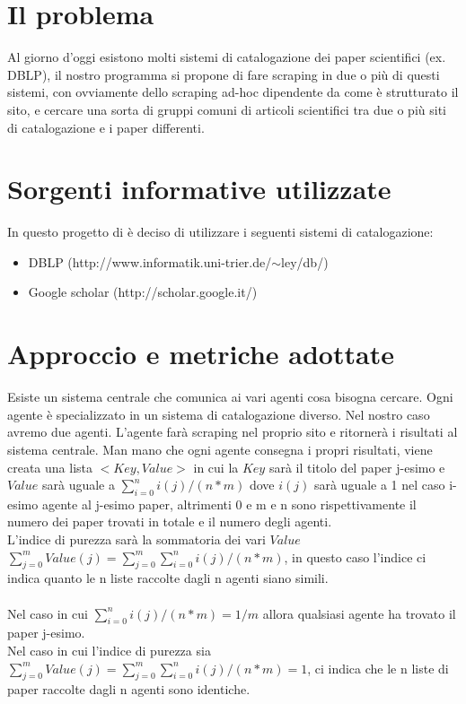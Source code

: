 \documentclass[12pt]{article}
\begin{document}
\maketitle

\section{Il problema}
Al giorno d'oggi esistono molti sistemi di catalogazione dei paper scientifici (ex. DBLP), il nostro programma si propone di fare scraping in due o pi\`u di questi sistemi, con ovviamente dello scraping ad-hoc dipendente da come \`e strutturato il sito, e cercare una sorta di gruppi comuni di articoli scientifici tra due o pi\`u siti di catalogazione e i paper differenti.

\section{Sorgenti informative utilizzate}
In questo progetto di \`e deciso di utilizzare i seguenti sistemi di catalogazione:
\begin{itemize}
\item DBLP (http://www.informatik.uni-trier.de/$\sim$ley/db/)
\item Google scholar (http://scholar.google.it/)
\end{itemize}

\section{Approccio e metriche adottate}
Esiste un sistema centrale che comunica ai vari agenti cosa bisogna cercare. Ogni agente \`e specializzato in un sistema di catalogazione diverso. Nel nostro caso avremo due agenti. L'agente far\`a scraping nel proprio sito e ritorner\`a i risultati al sistema centrale. Man mano che ogni agente consegna i propri risultati, viene creata una lista $<Key, Value>$ in cui la $Key$ sar\`a il titolo del paper j-esimo e $Value$ sar\`a uguale a $\displaystyle\sum\limits_{i=0}^n i(j)/(n*m)$ dove $i(j)$ sar\`a uguale a 1 nel caso i-esimo agente al j-esimo paper, altrimenti 0 e m e n sono rispettivamente il numero dei paper trovati in totale e il numero degli agenti.\\
L'indice di purezza sar\`a la sommatoria dei vari $Value$ $\displaystyle\sum\limits_{j=0}^m Value(j) = \displaystyle\sum\limits_{j=0}^m \displaystyle\sum\limits_{i=0}^n i(j)/(n*m)$, in questo caso l'indice ci indica quanto le n liste raccolte dagli n agenti siano simili. \\\\
Nel caso in cui $\displaystyle\sum\limits_{i=0}^n i(j)/(n*m) = 1/m$ allora qualsiasi agente ha trovato il paper j-esimo.\\
Nel caso in cui l'indice di purezza sia $\displaystyle\sum\limits_{j=0}^m Value(j) = \displaystyle\sum\limits_{j=0}^m \displaystyle\sum\limits_{i=0}^n i(j)/(n*m) = 1$, ci indica che le n liste di paper raccolte dagli n agenti sono identiche.\\
\end{document}
